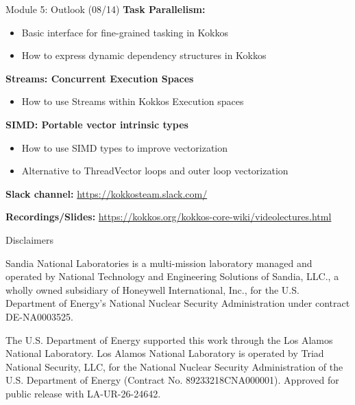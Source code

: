 \begin{frame}{Module 5: Outlook (08/14)}
    \vspace{-3pt}
	\textbf{Task Parallelism:}
	\begin{itemize}
        \item {Basic interface for fine-grained tasking in Kokkos}
        \item {How to express dynamic dependency structures in Kokkos}
	\end{itemize}
	
	\vspace{5pt}
	\textbf{Streams: Concurrent Execution Spaces}
	\begin{itemize}
		\item {How to use Streams within Kokkos Execution spaces}
	\end{itemize}

	\vspace{5pt}
	\textbf{SIMD: Portable vector intrinsic types}
	\begin{itemize}
		\item {How to use SIMD types to improve vectorization}
		\item {Alternative to ThreadVector loops and outer loop vectorization}
	\end{itemize}

	\vspace{5pt}
    \textbf{Slack channel:} {\scriptsize \url{https://kokkosteam.slack.com/}}
	
	\vspace{5pt}
	\textbf{Recordings/Slides:} {\scriptsize \url{https://kokkos.org/kokkos-core-wiki/videolectures.html}}

\end{frame}

\begin{frame}{Disclaimers}

\begin{block}{}\small
Sandia National Laboratories is a multi-mission laboratory managed and operated by National Technology and Engineering Solutions of Sandia, LLC., a wholly owned subsidiary of Honeywell International, Inc., for the U.S. Department of Energy’s National Nuclear Security Administration under contract DE-NA0003525.\newline
\sandid
\end{block}

\begin{block}{}
The U.S. Department of Energy supported this work through the Los Alamos National Laboratory. Los Alamos National Laboratory is operated by Triad National Security, LLC, for the National Nuclear Security Administration of the U.S. Department of Energy (Contract No. 89233218CNA000001). Approved for public release with LA-UR-26-24642. 
\end{block}

\end{frame}


